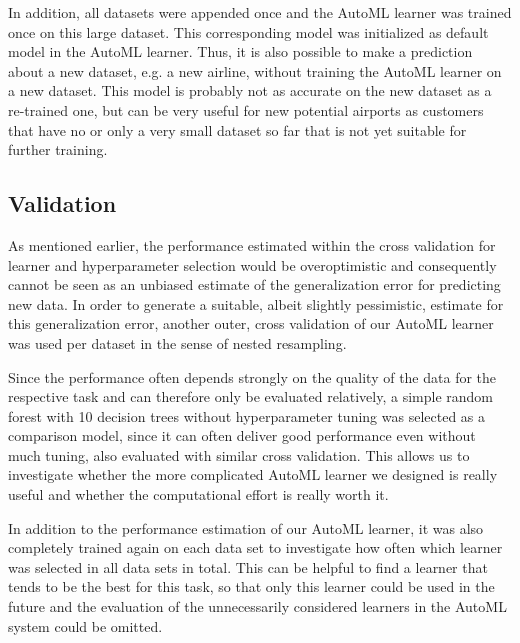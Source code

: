 \documentclass{article}
\begin{document}
In addition, all datasets were appended once and the AutoML learner was trained once on this large dataset. This corresponding model was initialized as default model in the AutoML learner. Thus, it is also possible to make a prediction about a new dataset, e.g. a new airline, without training the AutoML learner on a new dataset. This model is probably not as accurate on the new dataset as a re-trained one, but can be very useful for new potential airports as customers that have no or only a very small dataset so far that is not yet suitable for further training.

\subsection{Validation}

As mentioned earlier, the performance estimated within the cross validation for learner and hyperparameter selection would be overoptimistic and consequently cannot be seen as an unbiased estimate of the generalization error for predicting new data. In order to generate a suitable, albeit slightly pessimistic, estimate for this generalization error, another outer, cross validation of our AutoML learner was used per dataset in the sense of nested resampling.

Since the performance often depends strongly on the quality of the data for the respective task and can therefore only be evaluated relatively, a simple random forest with 10 decision trees without hyperparameter tuning was selected as a comparison model, since it can often deliver good performance even without much tuning, also evaluated with similar cross validation. This allows us to investigate whether the more complicated AutoML learner we designed is really useful and whether the computational effort is really worth it. 

In addition to the performance estimation of our AutoML learner, it was also completely trained again on each data set to investigate how often which learner was selected in all data sets in total. This can be helpful to find a learner that tends to be the best for this task, so that only this learner could be used in the future and the evaluation of the unnecessarily considered learners in the AutoML system could be omitted.
\end{document}
